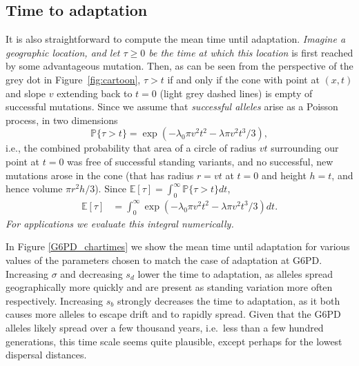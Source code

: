 \documentclass{article}
\newcommand{\gc}[1]{{\it\color{blue}#1}}
\newcommand{\mfp}[1]{{\it\color{red}#1}}
\renewcommand{\P}{\mathbb{P}}
\newcommand{\E}{\mathbb{E}}
\begin{document}

\subsection{Time to adaptation}

It is also straightforward to compute the mean time until adaptation.
\gc{Imagine a geographic location, and let $\tau \ge 0$ be the time at
which this location} is first reached by some advantageous mutation.
Then, as can be seen from the
perspective of the grey dot in Figure~\ref{fig:cartoon}, 
$\tau > t$ if and only if the cone with point at $(x,t)$ and slope $v$
extending back to $t=0$ (light grey dashed lines) is empty of
successful mutations. Since we assume that \mfp{successful alleles} arise as a Poisson process, 
in two dimensions
\begin{equation} \label{eqn-no-mut-t}
    \P\{ \tau > t \} = \exp\left( - \lambda_0 \pi v^2 t^2 - \lambda \pi v^2 t^3 / 3 \right) ,
\end{equation}
i.e., the combined probability that area of a circle of radius $vt$ surrounding our
point at $t=0$ was free of successful standing variants, and no
successful, new mutations arose in the cone (that has radius $r=vt$ at
$t=0$ and height $h=t$, and hence volume $\pi r^2 h/3$). 
Since $\E[\tau] = \int_0^\infty \P\{ \tau > t \} dt$,
\begin{align}
    \E[\tau] %
        &= \int_0^\infty \exp\left( - \lambda_0 \pi v^2 t^2 - \lambda \pi v^2 t^3 / 3 \right) dt.
\end{align}
\gc{For applications we evaluate this integral numerically. }  %


In Figure \ref{G6PD_chartimes} we show the mean time until adaptation
for various values of the parameters chosen to match the case of
adaptation at G6PD. Increasing $\sigma$ and decreasing $s_d$ lower 
the time to adaptation, as alleles spread geographically more quickly
and are present as standing variation more often
respectively. Increasing $s_b$ strongly decreases the time to
adaptation, as it both causes more alleles to escape drift and to
rapidly spread. Given that the G6PD alleles likely spread over a few
thousand years, i.e.\ less than a few hundred generations, 
this time scale seems quite plausible, except perhaps for the lowest dispersal distances.  
\end{document}
